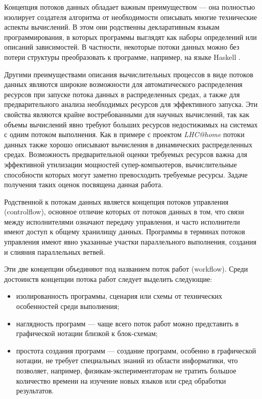 \documentclass[10pt,a4paper]{article}
\begin{document}
Концепция потоков данных обладает важным преимуществом --- она полностью изолирует создателя алгоритма от необходимости описывать многие
технические аспекты вычислений. В этом они родственны декларативным языкам программирования, в которых программы выглядят как наборы определений или описаний зависимостей.
В частности, некоторые потоки данных можно без потери структуры преобразовать к программе, например, на языке Haskell \cite{data-flow-process-networks}.

Другими преимуществами описания вычислительных процессов в виде потоков данных являются широкие возможности для автоматического
распределения ресурсов при запуске потока данных в распределенных средах, а также для предварительного анализа необходимых ресурсов для эффективного запуска.
Эти свойства являются крайне востребованными для научных вычислений, так как объемы вычислений явно требуют больших ресурсов недостижимых на системах с одним потоком выполнения.
Как в примере с проектом \textit{LHC@home} потоки данных также хорошо описывают вычисления в динамических распределенных средах.
Возможность предварительной оценки требуемых ресурсов важна для эффективной утилизации мощностей супер-компьютеров,
вычислительные способности которых могут заметно превосходить требуемые ресурсы. Задаче получения таких оценок посвящена данная работа.

Родственной к потокам данных является концепция потоков управления (controlflow), основное отличие которых от потоков данных в том, что связи между исполнителями
означают передачу управления, и часто исполнители имеют доступ к общему хранилищу данных. Программы в терминах потоков управления имеют явно указанные
участки параллельного выполнения, создания и слияния параллельных ветвей.

Эти две концепции объединяют под названием поток работ (workflow).
Среди достоинств концепции потока работ следует выделить следующие:
\begin{itemize}
  \item изолированность программы, сценария или схемы от технических особенностей среди выполнения;
  \item наглядность программ --- чаще всего поток работ можно представить в графической нотации близкой к блок-схемам;
  \item простота создания программ --- создание программ, особенно в графической нотации, не требует специальных знаний из области информатики,
        что позволяет, например, физикам-экспериментаторам не тратить большое количество времени на изучение новых языков или сред обработки результатов.
\end{itemize}
\end{document}
